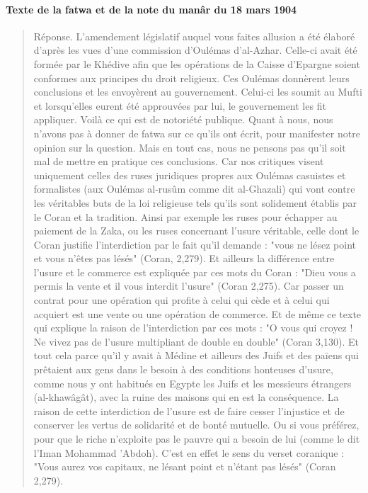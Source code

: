  \paragraph{Texte de la fatwa et de la note du manâr du 18 mars 1904}
 \begin{quote}
     Réponse. L'amendement législatif auquel vous faites allusion a été élaboré
d'après les vues d'une commission d'Oulémas d'al-Azhar. Celle-ci avait été formée
par le Khédive afin que les opérations de la Caisse d'Epargne soient conformes
aux principes du droit religieux. Ces Oulémas donnèrent leurs conclusions et les
envoyèrent au gouvernement. Celui-ci les soumit au Mufti et lorsqu'elles eurent
été approuvées par lui, le gouvernement les fit appliquer. Voilà ce qui est de
notoriété publique. Quant à nous, nous n'avons pas à donner de fatwa sur ce
qu'ils ont écrit, pour manifester notre opinion sur la question. Mais en tout cas,
nous ne pensons pas qu'il soit mal de mettre en pratique ces conclusions. Car nos
critiques visent uniquement celles des ruses juridiques propres aux Oulémas
casuistes et formalistes (aux Oulémas al-rusûm comme dit al-Ghazali) qui vont
contre les véritables buts de la loi religieuse tels qu'ils sont solidement établis par
le Coran et la tradition. Ainsi par exemple les ruses pour échapper au paiement de
la Zaka, ou les ruses concernant l'usure véritable, celle dont le Coran justifie
l'interdiction par le fait qu'il demande : "vous ne lésez point et vous n'êtes pas
lésés" (Coran, 2,279). Et ailleurs la différence entre l'usure et le commerce est
expliquée par ces mots du Coran : "Dieu vous a permis la vente et il vous interdit
l'usure" (Coran 2,275). Car passer un contrat pour une opération qui profite à
celui qui cède et à celui qui acquiert est une vente ou une opération de commerce.
Et de même ce texte qui explique la raison de l'interdiction par ces mots : "O
vous qui croyez ! Ne vivez pas de l'usure multipliant de double en double"
(Coran 3,130).
Et tout cela parce qu'il y avait à Médine et ailleurs des Juifs et des païens
qui prêtaient aux gens dans le besoin à des conditions honteuses d'usure, comme
nous y ont habitués en Egypte les Juifs et les messieurs étrangers (al-khawâgât),
avec la ruine des maisons qui en est la conséquence. La raison de cette
interdiction de l'usure est de faire cesser l'injustice et de conserver les vertus de
solidarité et de bonté mutuelle. Ou si vous préférez, pour que le riche n'exploite
pas le pauvre qui a besoin de lui (comme le dit l'Iman Mohammad 'Abdoh). C'est
en effet le sens du verset coranique : "Vous aurez vos capitaux, ne lésant point et
n'étant pas lésés" (Coran 2,279).


\end{quote}
